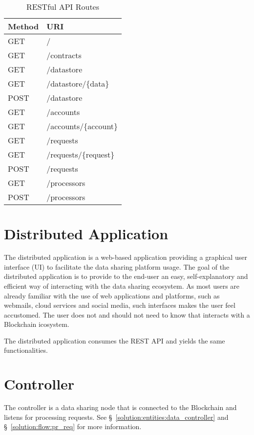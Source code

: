 \begin{table}[ht!]
\centering
\begin{tabular}{|l|l|}
\hline
 Method & URI  \\ \hline
 GET & /\  \\ \hline
 GET &  /contracts \\ \hline
 GET &  /datastore \\ \hline
 GET &  /datastore/\{data\} \\ \hline
 POST &  /datastore\\ \hline
 GET &  /accounts \\ \hline
 GET &  /accounts/\{account\} \\ \hline
 GET &  /requests \\ \hline
 GET &  /requests/\{request\} \\ \hline
 POST &  /requests \\ \hline
 GET &  /processors \\ \hline
 POST &  /processors \\ \hline
\end{tabular}
\caption{RESTful API Routes}
\label{table:api_routes}
\end{table}

\section{Distributed Application}
\label{implemenation:dapp}

The distributed application is a web-based application providing a graphical user interface (UI) to facilitate the data sharing platform usage. The goal of the distributed application is to provide to the end-user an easy, self-explanatory and efficient way of interacting with the data sharing ecosystem. As most users are already familiar with the use of web applications and platforms, such as webmails, cloud services and social media, such interfaces makes the user feel accustomed. The user does not and should not need to know that interacts with a Blockchain icosystem.

The distributed application consumes the REST API and yields the same functionalities.

\section{Controller}
\label{implemenation:controller}

The controller is a data sharing node that is connected to the Blockchain and listens for processing requests. See §~\ref{solution:entities:data_controller} and §~\ref{solution:flow:pr_req} for more information.

